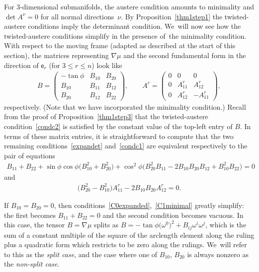 \documentclass[pdftex]{sigma}
\def\ve{\mathsf{e}}
\numberwithin{equation}{section}
\begin{document}
For 3-dimensional submanifolds, the austere condition amounts to minimality and \mbox{$\det A^\nu =0$} for all normal directions~$\nu$. By Proposition~\ref{thm1step1} the twisted-austere conditions imply the determinant condition. We~will now see how the twisted-austere conditions simplify in the presence of~the minimality condition. With respect to the moving frame (adapted as described at the start of this section), the matrices representing $\nabla \mu$ and the second fundamental form in the direction of $\ve_r$ (for $3 \le r \le n$) look like
\begin{gather} \label{austereABform}
B=\begin{pmatrix} -\tan \phi & B_{10} & B_{20} \\ B_{10} & B_{11} & B_{12} \\ B_{20} & B_{12} & B_{22} \end{pmatrix} , \qquad
A^r = \begin{pmatrix} 0 & 0 & 0 \\ 0 & A^r_{11} & A^r_{12} \\ 0 & A^r_{12} & -A^r_{11} \end{pmatrix} ,
\end{gather}
respectively. (Note that we have incorporated the minimality condition.) Recall from the proof of Proposition~\ref{thm1step3} that the twisted-austere condition~\eqref{condc2} is satisfied by the constant value of the top-left entry of $B$. In terms of these matrix entries, it is straightforward to compute that the two remaining conditions~\eqref{expandet} and~\eqref{condc1} are equivalent respectively to the pair of equations
\begin{gather} \label{C0expanded}B_{11}+B_{22} + \sin\phi \cos\phi \big(B_{10}^2 + B_{20}^2\big) + \cos^2\phi \big( B_{20}^2 B_{11} -2B_{10}B_{20} B_{12} + B_{10}^2 B_{22}\big)=0
\end{gather}
and
\begin{gather} \label{C1minimal}
\big(B_{20}^2 -B_{10}^2\big) A^r_{11} -2B_{10}B_{20} A^r_{12} =0.
\end{gather}

If $B_{10}=B_{20}=0$, then conditions~\eqref{C0expanded},~\eqref{C1minimal} greatly simplify: the first becomes $B_{11}+B_{22}=0$ and the second condition becomes vacuous. In this case, the tensor $B=\nabla \mu$ splits as \mbox{$B = - \tan \phi \big(\omega^0\big)^2 + B_{ij} \omega^i \omega^j$}, which is the sum of a constant multiple of the square of the arclength element along the ruling plus a quadratic form which restricts to be zero along the rulings. We~will refer to this as the \emph{split case}, and the case where one of $B_{10}$, $B_{20}$ is always nonzero as the \emph{non-split case}.
\end{document}
